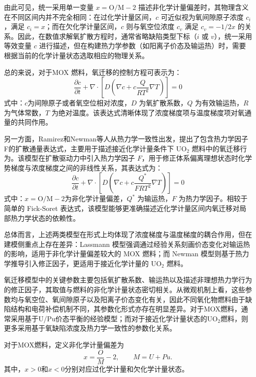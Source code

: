 由此可见，统一采用单一变量 $x=\mathrm{O/M}-2$ 描述非化学计量偏差时，其物理含义在不同区间内并不完全相同：在过化学计量区间，$c$ 可近似视为氧间隙原子浓度 $c_i$，满足 $c_i = x$；而在欠化学计量区间，$c$ 则与氧空位浓度 $c_v$ 满足 $c_v=-1/2x$ 的关系。因此，在数值求解氧扩散方程时，通常省略缺陷类型下标（$i$ 或 $v$），统一采用等效变量 $c$ 进行描述，但在构建热力学参数（如阳离子价态及输运热）时，需要根据当前的化学计量状态选取相应的物理关系。

总的来说，对于MOX 燃料，氧迁移的控制方程可表示为：
\begin{equation}
	\frac{\partial c}{\partial t} + \nabla \cdot \left[ D \left( \nabla c + c \frac{Q}{R T^2} \nabla T \right) \right] = 0
\end{equation}
式中：$c$为间隙原子或者氧空位相对浓度，$D$ 为氧扩散系数，$Q$ 为有效输运热，$R$ 为气体常数，$T$ 为绝对温度。该表达式清晰体现了浓度梯度项与温度梯度项对氧通量的共同作用。

另一方面，Ramirez和Newman等人\cite{ramirezSimulationsHeatOxygen2006,newmanThreeDimensionalCoupled2009}从热力学一致性出发，提出了包含热力学因子F的扩散通量表达式，主要用于描述接近化学计量条件下 UO$_2$ 燃料中的氧迁移行为。该模型在扩散驱动力中引入热力学因子 $F$，用于修正体系偏离理想状态时化学势梯度与浓度梯度之间的非线性关系，其表达式为：
\begin{equation}
	\frac{\partial c}{\partial t} + \nabla \cdot \left[ D \left( \nabla c + c \frac{Q^*}{F R T^2} \nabla T \right) \right] = 0
\end{equation}
式中：$x=\mathrm{O/M}-2$为非化学计量偏差，$Q^*$ 为输运热，$F$ 为热力学因子。相较于简单的 Fick-Soret 表达式，该模型能够更准确描述近化学计量区间内氧迁移对局部热力学状态的依赖性。

总体而言，上述两类模型在形式上均体现了浓度梯度与温度梯度的耦合作用，但在建模侧重点上存在差异：Lassmann 模型强调通过经验关系刻画价态变化对输运热的影响，适用于非化学计量偏差较大的 MOX 燃料；而 Newman 模型则基于热力学推导引入修正因子，更适用于接近化学计量的 UO$_2$ 燃料。

氧迁移模型中的关键参数主要包括氧扩散系数、输运热以及描述非理想热力学行为的修正因子，其取值与燃料的非化学计量状态密切相关。从微观机制上看，这些参数均与氧空位、氧间隙原子以及阳离子价态变化有关，因此不同氧化物燃料由于缺陷结构和电荷补偿机制不同，其参数化形式亦存在明显差异。对于MOX燃料，通常采用基于U/Pu价态平衡的经验模型；而对于接近化学计量状态的UO$_2$燃料，则更多采用基于氧缺陷浓度及热力学一致性的参数化关系。

对于MOX燃料，定义非化学计量偏差为
\begin{equation}
	x=\frac{O}{M}-2,
	\qquad
	M=U+Pu .
\end{equation}
其中，$x>0$和$x<0$分别对应过化学计量和欠化学计量状态。

